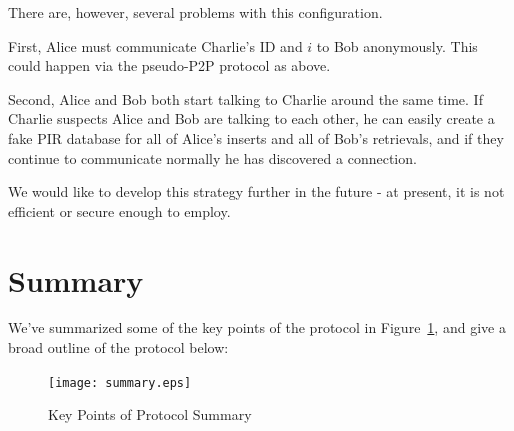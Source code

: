 \documentclass[twocolumn,11pt,english]{article}
\begin{document}
\begin{description}
There are, however, several problems with this configuration.

First, Alice must communicate Charlie's ID and $i$ to Bob anonymously. This could happen via the pseudo-P2P protocol as above. 

Second, Alice and Bob both start talking to Charlie around the same time. If Charlie suspects Alice and Bob are talking to each other, he can easily create a fake PIR database for all of Alice's inserts and all of Bob's retrievals, and if they continue to communicate normally he has discovered a connection. 

We would like to develop this strategy further in the future - at present, it is not efficient or secure enough to employ.
\end{description}

\section{Summary}
 We've summarized some of the key points of the protocol in Figure~\ref{fig:keypoints}, and give a broad outline of the protocol below:

\begin{figure}[scale=0.7]
\texttt{[image: summary.eps]}
\caption{Key Points of Protocol Summary}
\label{fig:keypoints}
\end{figure}
\end{document}
